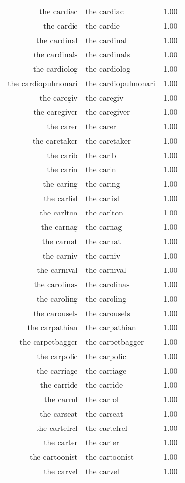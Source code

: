\begin{table}[ht]
\begin{tabular}{rlr}
  the cardiac & the cardiac & 1.00 \\ 
  the cardie & the cardie & 1.00 \\ 
  the cardinal & the cardinal & 1.00 \\ 
  the cardinals & the cardinals & 1.00 \\ 
  the cardiolog & the cardiolog & 1.00 \\ 
  the cardiopulmonari & the cardiopulmonari & 1.00 \\ 
  the caregiv & the caregiv & 1.00 \\ 
  the caregiver & the caregiver & 1.00 \\ 
  the carer & the carer & 1.00 \\ 
  the caretaker & the caretaker & 1.00 \\ 
  the carib & the carib & 1.00 \\ 
  the carin & the carin & 1.00 \\ 
  the caring & the caring & 1.00 \\ 
  the carlisl & the carlisl & 1.00 \\ 
  the carlton & the carlton & 1.00 \\ 
  the carnag & the carnag & 1.00 \\ 
  the carnat & the carnat & 1.00 \\ 
  the carniv & the carniv & 1.00 \\ 
  the carnival & the carnival & 1.00 \\ 
  the carolinas & the carolinas & 1.00 \\ 
  the caroling & the caroling & 1.00 \\ 
  the carousels & the carousels & 1.00 \\ 
  the carpathian & the carpathian & 1.00 \\ 
  the carpetbagger & the carpetbagger & 1.00 \\ 
  the carpolic & the carpolic & 1.00 \\ 
  the carriage & the carriage & 1.00 \\ 
  the carride & the carride & 1.00 \\ 
  the carrol & the carrol & 1.00 \\ 
  the carseat & the carseat & 1.00 \\ 
  the cartelrel & the cartelrel & 1.00 \\ 
  the carter & the carter & 1.00 \\ 
  the cartoonist & the cartoonist & 1.00 \\ 
  the carvel & the carvel & 1.00 \\ 

\end{tabular}
\end{table}
